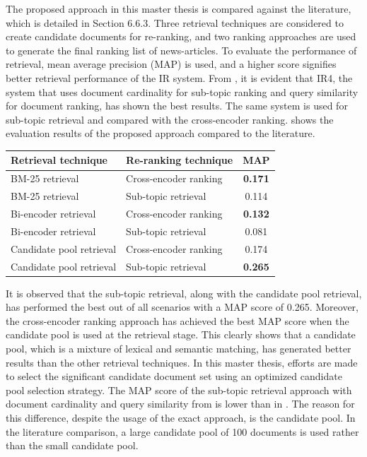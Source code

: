 The proposed approach in this master thesis is compared against the literature, which is detailed in Section 6.6.3. Three retrieval techniques are considered to create candidate documents for re-ranking, and two ranking approaches are used to generate the final ranking list of news-articles. To evaluate the performance of retrieval, mean average precision (MAP) is used, and a higher score signifies better retrieval performance of the IR system. From , it is evident that IR4, the system that uses document cardinality for sub-topic ranking and query similarity for document ranking, has shown the best results. The same system is used for sub-topic retrieval and compared with the cross-encoder ranking.  shows the evaluation results of the proposed approach compared to the literature.

\begin{center}
	\label{tab:literature_results}
	\begin{tabularx}{0.8\textwidth}{|Y|Y|c|}
		\hline
		Retrieval technique & Re-ranking technique & MAP \\
		\hline
		BM-25 retrieval & Cross-encoder ranking & \textbf{0.171}  \\
		\hline
		BM-25 retrieval  & Sub-topic retrieval & 0.114 \\
		\hline
		\hline
		Bi-encoder retrieval  & Cross-encoder ranking & \textbf{0.132} \\
		\hline
		Bi-encoder retrieval  & Sub-topic retrieval & 0.081 \\
		\hline
		\hline
		Candidate pool retrieval  & Cross-encoder ranking & 0.174 \\
		\hline
		Candidate pool retrieval & Sub-topic retrieval &  \textbf{0.265} \\
		\hline
	\end{tabularx}
\end{center}


It is observed that the sub-topic retrieval, along with the candidate pool retrieval, has performed the best out of all scenarios with a \ac{MAP} score of 0.265. Moreover, the cross-encoder ranking approach has achieved the best \ac{MAP} score when the candidate pool is used at the retrieval stage. This clearly shows that a candidate pool, which is a mixture of lexical and semantic matching, has generated better results than the other retrieval techniques. In this master thesis, efforts are made to select the significant candidate document set using an optimized candidate pool selection strategy. The \ac{MAP} score of the sub-topic retrieval approach with document cardinality and query similarity from  is lower than in . The reason for this difference, despite the usage of the exact approach, is the candidate pool. In the literature comparison, a large candidate pool of 100 documents is used rather than the small candidate pool.

